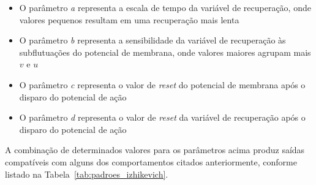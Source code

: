 \begin{itemize}
	\item O parâmetro \textit{a} representa a escala de tempo da variável de recuperação, onde valores pequenos resultam em uma recuperação mais lenta
	\item O parâmetro \textit{b} representa a sensibilidade da variável de recuperação às subflutuações do potencial de membrana, onde valores maiores agrupam mais $v$ e $u$
	\item O parâmetro \textit{c} representa o valor de \textit{reset} do potencial de membrana após o disparo do potencial de ação
	\item O parâmetro \textit{d} representa o valor de \textit{reset} da variável de recuperação após o disparo do potencial de ação
\end{itemize}
A combinação de determinados valores para os parâmetros acima produz saídas compatíveis com alguns dos comportamentos citados anteriormente, conforme listado na Tabela~\ref{tab:padroes_izhikevich}.
\begin{table}
\end{table}

